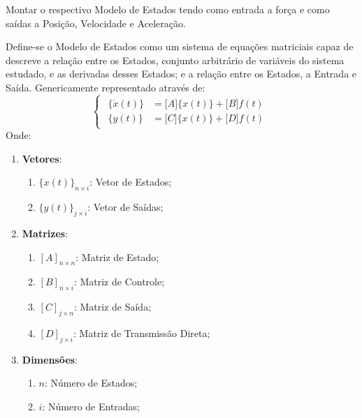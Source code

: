 \documentclass{article}
\begin{document}
\newpage
\begin{exercise}\label{ex14}
    Montar o respectivo Modelo de Estados tendo como entrada a força e como saídas a Posição, Velocidade e Aceleração.
\end{exercise}
\begin{resolution}
    Define-se o Modelo de Estados como um sistema de equações matriciais capaz de descreve a relação entre os Estados, conjunto arbitrário de variáveis do sistema estudado, e as derivadas desses Estados; e a relação entre os Estados, a Entrada e Saída. Genericamente representado através de:
    \begin{equation}
    \begin{cases}
    \begin{aligned}
        \lbrace \dot{x}(t) \rbrace &= 
        \lbrack A \rbrack \lbrace x(t) \rbrace + \lbrack B \rbrack f(t)\\
        \lbrace y(t) \rbrace &= 
        \lbrack C \rbrack \lbrace x(t) \rbrace + \lbrack D \rbrack f(t)
    \end{aligned}
    \end{cases}
    \end{equation}
    Onde:
    \begin{enumerate}
        \item \textbf{Vetores}:
        \begin{enumerate}
            \item $\lbrace x(t) \rbrace_{n\times i}$: Vetor de Estados;
            \item $\lbrace y(t) \rbrace_{j\times i}$: Vetor de Saídas;
        \end{enumerate}
        \item \textbf{Matrizes}:
        \begin{enumerate}
            \item $[A]_{n\times n}$: Matriz de Estado;
            \item $[B]_{n\times i}$: Matriz de Controle;
            \item $[C]_{j\times n}$: Matriz de Saída;
            \item $[D]_{j\times i}$: Matriz de Transmissão Direta;
        \end{enumerate}
        \item \textbf{Dimensões}:
        \begin{enumerate}[noitemsep]
            \item $n$: Número de Estados;
            \item $i$: Número de Entradas;

\end{enumerate}
\end{enumerate}
\end{resolution}
\end{document}
